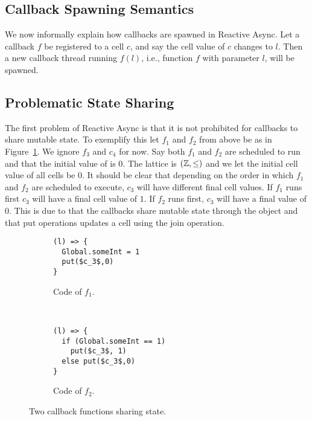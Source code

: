 \subsection{Callback Spawning Semantics}%
\label{sub:callback_spawning_semantics_ra}

We now informally explain how callbacks are spawned in Reactive Async.  Let a
callback $f$ be registered to a cell $c$, and say the cell value of $c$ changes
to $l$. Then a new callback thread running $f(l)$, i.e., function $f$ with
parameter $l$, will be spawned.

\subsection{Problematic State Sharing}%
\label{sub:sharing_state}

The first problem of Reactive Async is that it is not prohibited for callbacks
to share mutable state. To exemplify this let $f_1$ and $f_2$ from above be as
in Figure~\ref{fig:ra_fun_shared_state}. We ignore $f_3$ and $c_4$ for now. 
Say both $f_1$ and $f_2$ are scheduled to run and that the initial value of
 is $0$.  The lattice is $(\mathbb{Z}, \leq)$ and we let the
initial cell value of all cells be $0$.  It should be clear that depending on
the order in which $f_1$ and $f_2$ are scheduled to execute, $c_3$ will have 
different final cell values. If $f_1$ runs first $c_3$ will have a final cell
value of $1$. If $f_2$ runs first, $c_3$ will have a final value of $0$. This is
due to that the callbacks share mutable state through the  object
and that put operations updates a cell using the join operation.

\begin{figure}
  \begin{subfigure}[b]{0.5\textwidth}
    \begin{lstlisting}
(l) => {
  Global.someInt = 1
  put($c_3$,0)
}
    \end{lstlisting}
    \caption{Code of $f_1$.}
  \end{subfigure}
  ~
  \begin{subfigure}[b]{0.5\textwidth}
    \begin{lstlisting}
(l) => {
  if (Global.someInt == 1)
    put($c_3$, 1)
  else put($c_3$,0)
}
    \end{lstlisting}
    \caption{Code of $f_2$.}
  \end{subfigure}
  \caption{Two callback functions sharing state.}
  \label{fig:ra_fun_shared_state}
\end{figure}

